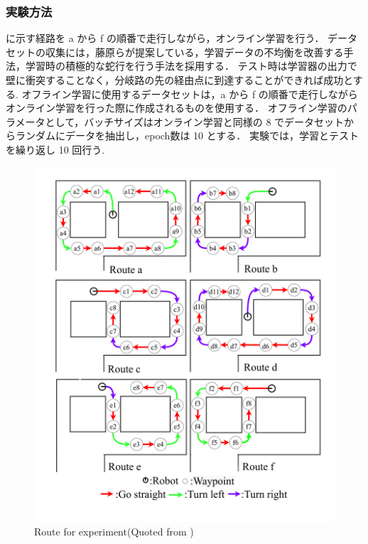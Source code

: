 \clearpage
\subsubsection{実験方法}
に示す経路を a から f の順番で走行しながら，オンライン学習を行う．
データセットの収集には，藤原ら\cite{fujiwara2023}が提案している，学習データの不均衡を改善する手法，学習時の積極的な蛇行を行う手法を採用する．
テスト時は学習器の出力で壁に衝突することなく，分岐路の先の経由点に到達することができれば成功とする.
オフライン学習に使用するデータセットは，a から f の順番で走行しながらオンライン学習を行った際に作成されるものを使用する．
オフライン学習のパラメータとして，バッチサイズはオンライン学習と同様の 8 でデータセットからランダムにデータを抽出し，epoch数は 10 とする．
実験では，学習とテストを繰り返し 10 回行う.

\begin{figure}
  \centering
  \includegraphics[width=130mm]{images/pdf/fujiwara/route.pdf}
  \caption[Route for experiment]{Route for experiment(Quoted from \cite{fujiwara2023})}
  \label{fig:fujiwara_route}
\end{figure}

